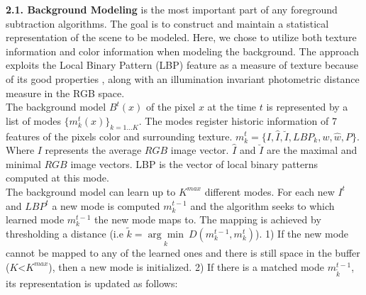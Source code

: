\documentclass[10pt,letterpaper]{article}
\begin{document}
%
{\bf 2.1. Background Modeling} is the most important part of any foreground subtraction algorithms. The goal is to construct
and maintain a statistical representation of the scene to be modeled. Here, we chose to utilize both texture information and color information when modeling the background. The approach \cite{odobez1} exploits the Local Binary Pattern (LBP) feature as a measure of texture because of its good properties \cite{Halika}, along with an illumination invariant photometric distance measure in the RGB space.\\
The background model ${{B}^{t}(x)}$ of the pixel $x$ at the time $t$ is represented by a list of modes $\{ {m}^{t}_{k}(x)\}_{k=1\dots K}$. The modes register historic information of 7 features of the pixels color and surrounding texture. ${m}^{t}_{k} = \{I ,\hat{I},\breve{I}, {LBP}_{k}, w,  \hat{w}, P \}$. Where ${I}$ represents the average $RGB$ image vector. $\hat{I}$ and $\breve{I}$ are the maximal and minimal $RGB$ image vectors. {LBP} is the vector of local binary patterns computed at this mode.\\
The background model can learn up to $K^{max}$ different modes. For each new $I^{t}$ and $LBP^{t}$ a new mode is computed $m^{t-1}_{k}$ and the algorithm seeks to which learned mode $m^{t-1}_{k}$ the new mode maps to. The mapping is achieved by thresholding a distance (i.e $\tilde{k} = \underset{{k}}{\arg\min} ~ D(m^{t-1}_{k},m^{t}_{k})$). 1) If the new mode cannot be mapped to any of the learned ones and there is still space in the buffer ($K $\textless$ K^{max}$), then a new mode is initialized. 2) If there is a matched mode $m^{t-1}_{\tilde{k}}$, its representation is updated as follows:
\end{document}
